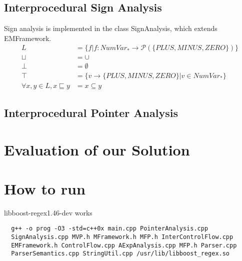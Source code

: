 \documentclass[a4paper,11pt]{article}
\begin{document}
\subsection{Interprocedural Sign Analysis}
Sign analysis is implemented in the class SignAnalysis, which extends EMFramework.
\begin{align*}
  L &= \{ f | f: \textbf{$NumVar_*$} \rightarrow \mathcal{P}(\{PLUS, MINUS, ZERO\}) \} \\
  \sqcup &= \cup \\
  \bot  &= \emptyset\\
  \top &= \{ v \rightarrow \{PLUS, MINUS, ZERO\}| v \in \textbf{$NumVar_*$}\} \\
  \forall x, y \in L, x \sqsubseteq y &= x \subseteq y
\end{align*}

\subsection{Interprocedural Pointer Analysis}

\section{Evaluation of our Solution}

\section{How to run}
libboost-regex1.46-dev works

\begin{lstlisting}
  g++ -o prog -O3 -std=c++0x main.cpp PointerAnalysis.cpp 
  SignAnalysis.cpp MVP.h MFramework.h MFP.h InterControlFlow.cpp 
  EMFramework.h ControlFlow.cpp AExpAnalysis.cpp MFP.h Parser.cpp 
  ParserSemantics.cpp StringUtil.cpp /usr/lib/libboost_regex.so

\end{lstlisting}
\end{document}
